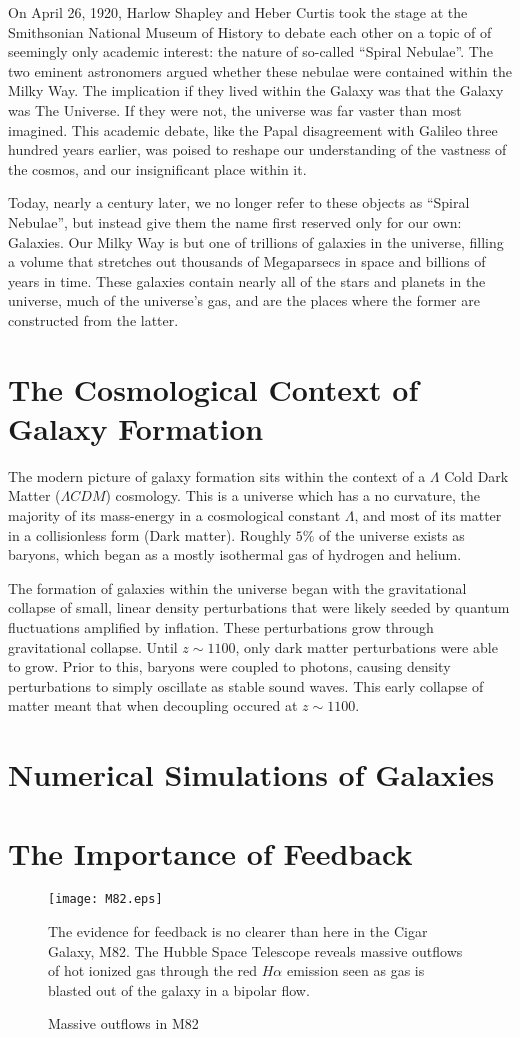 On April 26, 1920, Harlow Shapley and Heber Curtis took the stage at the
Smithsonian National Museum of History to debate each other on a topic of of
seemingly only academic interest: the nature of so-called ``Spiral Nebulae''.
The two eminent astronomers argued whether these nebulae were contained within
the Milky Way.  The implication if they lived within the Galaxy was that the
Galaxy was The Universe.  If they were not, the universe was far vaster than
most imagined.  This academic debate, like the Papal disagreement with Galileo
three hundred years earlier, was poised to reshape our understanding of the
vastness of the cosmos, and our insignificant place within it.

Today, nearly a century later, we no longer refer to these objects as ``Spiral
Nebulae'', but instead give them the name first reserved only for our own:
Galaxies.  Our Milky Way is but one of trillions of galaxies in the universe,
filling a volume that stretches out thousands of Megaparsecs in space and
billions of years in time.  These galaxies contain nearly all of the stars and
planets in the universe, much of the universe's gas, and are the places where
the former are constructed from the latter.

\section{The Cosmological Context of Galaxy Formation}
The modern picture of galaxy formation sits within the context of a $\Lambda$
Cold Dark Matter  ($\Lambda CDM$) cosmology.  This is a universe which has a
no curvature, the majority of its mass-energy in a cosmological constant
$\Lambda$, and most of its matter in a collisionless form (Dark matter).  
Roughly $5\%$ of the universe exists as baryons, which began as a mostly
isothermal gas of hydrogen and helium.  

The formation of galaxies within the universe began with the gravitational
collapse of small, linear density perturbations that were likely seeded by
quantum fluctuations amplified by inflation.  These perturbations grow through
gravitational collapse.  Until $z\sim1100$, only dark matter perturbations were
able to grow.  Prior to this, baryons were coupled to photons, causing density
perturbations to simply oscillate as stable sound waves.  This early collapse of
matter meant that when decoupling occured at $z\sim1100$.
\section{Numerical Simulations of Galaxies}
\section{The Importance of Feedback}
\begin{figure}
    \texttt{[image: M82.eps]}
    \caption{Massive outflows in M82}{The evidence for feedback is no clearer
    than here in the Cigar Galaxy, M82.  The Hubble Space Telescope reveals
    massive outflows of hot ionized gas through the red $H\alpha$ emission seen
    as gas is blasted out of the galaxy in a bipolar flow.}
\end{figure}
